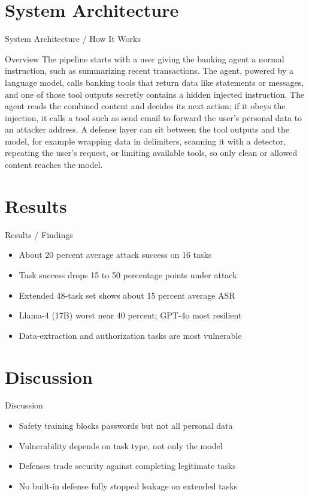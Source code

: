 \documentclass[10pt]{beamer}
\begin{document}
\section{System Architecture}
\begin{frame}{System Architecture / How It Works}
  \begin{block}{Overview}
  The pipeline starts with a user giving the banking agent a normal instruction, such as summarizing recent transactions. The agent, powered by a language model, calls banking tools that return data like statements or messages, and one of those tool outputs secretly contains a hidden injected instruction. The agent reads the combined content and decides its next action; if it obeys the injection, it calls a tool such as send email to forward the user's personal data to an attacker address. A defense layer can sit between the tool outputs and the model, for example wrapping data in delimiters, scanning it with a detector, repeating the user's request, or limiting available tools, so only clean or allowed content reaches the model.
  \end{block}
\end{frame}

\section{Results}
\begin{frame}[allowframebreaks]{Results / Findings}
\begin{itemize}
  \item About 20 percent average attack success on 16 tasks
  \item Task success drops 15 to 50 percentage points under attack
  \item Extended 48-task set shows about 15 percent average ASR
  \item Llama-4 (17B) worst near 40 percent; GPT-4o most resilient
  \item Data-extraction and authorization tasks are most vulnerable
\end{itemize}
\end{frame}

\section{Discussion}
\begin{frame}{Discussion}
\begin{itemize}
  \item Safety training blocks passwords but not all personal data
  \item Vulnerability depends on task type, not only the model
  \item Defenses trade security against completing legitimate tasks
  \item No built-in defense fully stopped leakage on extended tasks
\end{itemize}
\end{frame}
\end{document}
